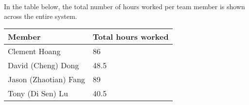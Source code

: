 \documentclass{article}
\begin{document}
In the table below, the total number of hours worked per team member is shown across the entire system. \\
\begin{tabular}{ | l | l | }
	\hline
    Member & Total hours worked \\
    \hline
  	Clement Hoang & 86 \\
  	David (Cheng) Dong & 48.5 \\
	  Jason (Zhaotian) Fang & 89 \\
	  Tony (Di Sen) Lu & 40.5 \\
    \hline
\end{tabular}
\end{document}

